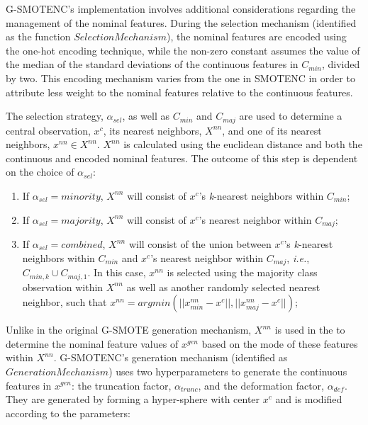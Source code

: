 \documentclass[preprint,12pt]{elsarticle}
\begin{document}
{G-SMOTENC's implementation involves additional considerations regarding the
management of the nominal features. During the selection mechanism (identified
as the function $SelectionMechanism$), the nominal features are encoded
using the one-hot encoding technique, while the non-zero constant assumes the
value of the median of the standard deviations of the continuous features in
$C_{min}$, divided by two. This encoding mechanism varies from the one in
SMOTENC in order to attribute less weight to the nominal features relative
to the continuous features.

The selection strategy, $\alpha_{sel}$, as well as $C_{min}$ and $C_{maj}$ are
used to determine a central observation, $x^c$, its nearest neighbors,
$X^{nn}$, and one of its nearest neighbors, $x^{nn} \in X^{nn}$. $X^{nn}$ is
calculated using the euclidean distance and both the continuous and encoded
nominal features. The outcome of this step is dependent on the choice of
$\alpha_{sel}$:

\begin{enumerate}
    \item If $\alpha_{sel} = \mathit{minority}$, $X^{nn}$ will consist of
        $x^c$'s \textit{k}-nearest neighbors within $C_{min}$;
    \item If $\alpha_{sel} = \mathit{majority}$, $X^{nn}$ will consist of
        $x^c$'s nearest neighbor within $C_{maj}$; 
    \item If $\alpha_{sel} = \mathit{combined}$, $X^{nn}$ will consist of the
        union between $x^c$'s \textit{k}-nearest neighbors within $C_{min}$
        and $x^c$'s nearest neighbor within $C_{maj}$, \textit{i.e.},
        $C_{min,k} \cup C_{maj,1}$. In this case, $x^{nn}$ is selected using
        the majority class observation within $X^{nn}$ as well as another
        randomly selected nearest neighbor, such that $x^{nn} =
        argmin(||x^{nn}_{min}-x^c||, ||x^{nn}_{maj}-x^c||)$;
\end{enumerate}

Unlike in the original G-SMOTE generation mechanism, $X^{nn}$ is used in the
to determine the nominal feature values of $x^{gen}$ based on the mode of
these features within $X^{nn}$. G-SMOTENC's generation mechanism (identified
as $GenerationMechanism$) uses two hyperparameters to generate the continuous
features in $x^{gen}$: the truncation factor, $\alpha_{trunc}$, and the
deformation factor, $\alpha_{def}$. They are generated by forming a
hyper-sphere with center $x^c$ and is modified according to the parameters:

}
\end{document}
